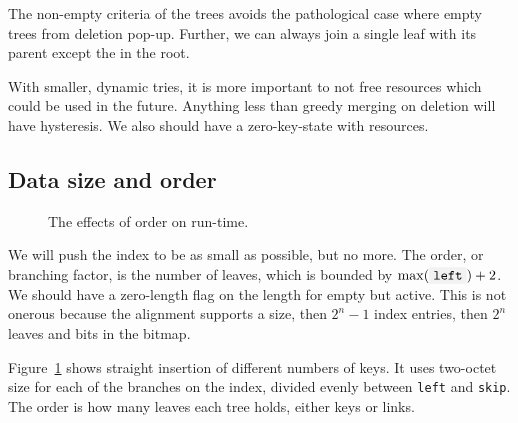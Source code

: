 \documentclass[12pt]{article}
\newcommand{\code}[1]{\colorbox{light-gray}{\texttt{#1}}}
\begin{document}
The non-empty criteria of the trees avoids the pathological case where empty trees from deletion pop-up. Further, we can always join a single leaf with its parent except the in the root.

With smaller, dynamic tries, it is more important to not free resources which could be used in the future. Anything less than greedy merging on deletion will have hysteresis. We also should have a zero-key-state with resources.


\subsection{Data size and order}

\begin{figure}%
\centering%
\caption{The effects of order on run-time.}%
\label{timing}%
\end{figure}%

We will push the index to be as small as possible, but no more. The order, or branching factor, is the number of leaves, which is bounded by $\max(\code{left}) + 2$. We should have a zero-length flag on the length for empty but active. This is not onerous because the alignment supports a size, then $2^n-1$ index entries, then $2^n$ leaves and bits in the bitmap.

Figure~\ref{timing} shows straight insertion of different numbers of keys. It uses two-octet size for each of the branches on the index, divided evenly between \code{left} and \code{skip}. The order is how many leaves each tree holds, either keys or links.
\end{document}
